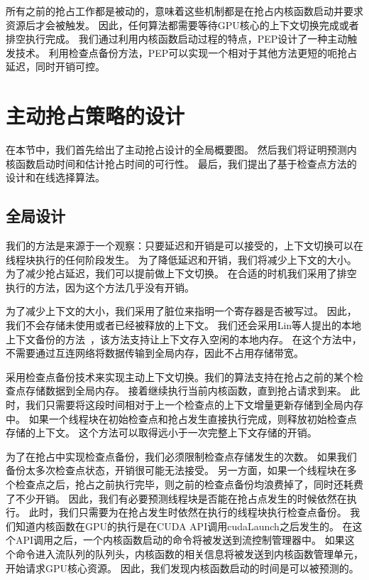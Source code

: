 所有之前的抢占工作都是被动的，意味着这些机制都是在抢占内核函数启动并要求资源后才会被触发。
因此，任何算法都需要等待GPU核心的上下文切换完成或者排空执行完成。
我们通过利用内核函数启动过程的特点，PEP设计了一种主动触发技术。
利用检查点备份方法，PEP可以实现一个相对于其他方法更短的呃抢占延迟，同时开销可控。

\section{主动抢占策略的设计}
\label{sec:pepdesign}

在本节中，我们首先给出了主动抢占设计的全局概要图。
然后我们将证明预测内核函数启动时间和估计抢占时间的可行性。
最后，我们提出了基于检查点方法的设计和在线选择算法。

\subsection{全局设计}
我们的方法是来源于一个观察：只要延迟和开销是可以接受的，上下文切换可以在线程块执行的任何阶段发生。
为了降低延迟和开销，我们将减少上下文的大小。
为了减少抢占延迟，我们可以提前做上下文切换。
在合适的时机我们采用了排空执行的方法，因为这个方法几乎没有开销。

为了减少上下文的大小，我们采用了脏位来指明一个寄存器是否被写过。
因此，我们不会存储未使用或者已经被释放的上下文。
我们还会采用Lin等人提出的本地上下文备份的方法~，该方法支持让上下文存入空闲的本地内存。
在这个方法中，不需要通过互连网络将数据传输到全局内存，因此不占用存储带宽。

采用检查点备份技术来实现主动上下文切换。我们的算法支持在抢占之前的某个检查点存储数据到全局内存。
接着继续执行当前内核函数，直到抢占请求到来。
此时，我们只需要将这段时间相对于上一个检查点的上下文增量更新存储到全局内存中。
如果一个线程块在初始检查点和抢占发生直接执行完成，则释放初始检查点存储的上下文。
这个方法可以取得远小于一次完整上下文存储的开销。

为了在抢占中实现检查点备份，我们必须限制检查点存储发生的次数。
如果我们备份太多次检查点状态，开销很可能无法接受。
另一方面，如果一个线程块在多个检查点之后，抢占之前执行完毕，则之前的检查点备份均浪费掉了，同时还耗费了不少开销。
因此，我们有必要预测线程块是否能在抢占点发生的时候依然在执行。
此时，我们只需要为在抢占发生时依然在执行的线程块执行检查点备份。
我们知道内核函数在GPU的执行是在CUDA API调用cudaLaunch之后发生的。
在这个API调用之后，一个内核函数启动的命令将被发送到流控制管理器中。
如果这个命令进入流队列的队列头，内核函数的相关信息将被发送到内核函数管理单元，开始请求GPU核心资源。
因此，我们发现内核函数启动的时间是可以被预测的。

